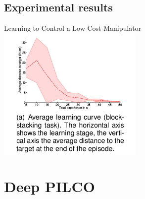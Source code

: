 \documentclass{beamer}
\begin{document}
\subsection{Experimental results}
\begin{center}
Learning to Control a Low-Cost Manipulator
    \includegraphics[height=6.5cm]{img/curve-arm.png}
\end{center}

\section{Deep PILCO}
\end{document}

